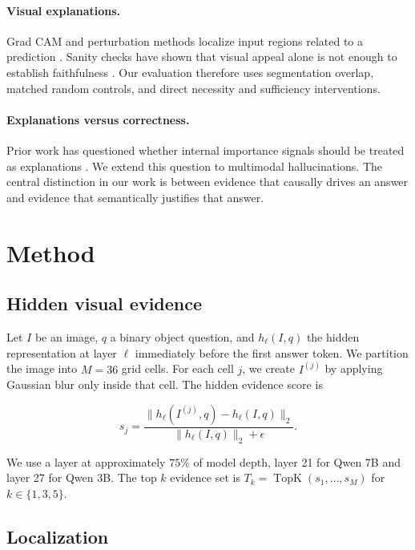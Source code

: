 \documentclass{article}
\begin{document}
\paragraph{Visual explanations.}
Grad CAM and perturbation methods localize input regions related to a prediction \citep{selvaraju2017gradcam,fong2017meaningful}. Sanity checks have shown that visual appeal alone is not enough to establish faithfulness \citep{adebayo2018sanity}. Our evaluation therefore uses segmentation overlap, matched random controls, and direct necessity and sufficiency interventions.

\paragraph{Explanations versus correctness.}
Prior work has questioned whether internal importance signals should be treated as explanations \citep{jain2019attention,wiegreffe2019attention}. We extend this question to multimodal hallucinations. The central distinction in our work is between evidence that causally drives an answer and evidence that semantically justifies that answer.

\section{Method}

\subsection{Hidden visual evidence}

Let $I$ be an image, $q$ a binary object question, and $h_{\ell}(I,q)$ the hidden representation at layer $\ell$ immediately before the first answer token. We partition the image into $M=36$ grid cells. For each cell $j$, we create $I^{(j)}$ by applying Gaussian blur only inside that cell. The hidden evidence score is

\begin{equation}
 s_j = \frac{\lVert h_{\ell}(I^{(j)},q)-h_{\ell}(I,q)\rVert_2}
 {\lVert h_{\ell}(I,q)\rVert_2+\epsilon}.
\end{equation}

We use a layer at approximately $75\%$ of model depth, layer 21 for Qwen 7B and layer 27 for Qwen 3B. The top $k$ evidence set is $T_k=\operatorname{TopK}(s_1,\ldots,s_M)$ for $k\in\{1,3,5\}$.

\subsection{Localization}
\end{document}
